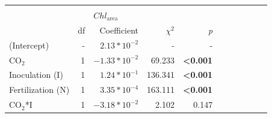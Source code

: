 \begin{landscape}
\begin{table}
{\begin{tabular}{p{3cm}p{0.5cm}p{1.75cm}p{1.5cm}p{1.5cm}p{1.75cm}p{1.5cm}p{1.5cm}p{1.75cm}p{1.5cm}p{1.5cm}}
            &&&&&&&&&&
            \\

            && \multicolumn{3}{l}{$Chl_\mathrm{area}$} &&&&& \\
            \hline
            & \multicolumn{1}{r}{df}
            & \multicolumn{1}{r}{Coefficient} & \multicolumn{1}{r}{$\chi^2$} & \multicolumn{1}{r}{\textit{p}} 
            \\
            \hline

            (Intercept) & \multicolumn{1}{r}{-}
            & \multicolumn{1}{r}{$2.13*10^{-2}$}  & \multicolumn{1}{r}{-}         & \multicolumn{1}{r}{-}
            & \multicolumn{1}{r}{}          & \multicolumn{1}{r}{}          & \multicolumn{1}{r}{}
            & \multicolumn{1}{r}{}          & \multicolumn{1}{r}{}          & \multicolumn{1}{r}{}
            \\

            CO$_2$ & \multicolumn{1}{r}{1}
            & \multicolumn{1}{r}{$-1.33*10^{-2}$} & \multicolumn{1}{r}{69.233}   & \multicolumn{1}{r}{\textbf{<0.001}}
            & \multicolumn{1}{r}{}          & \multicolumn{1}{r}{}          & \multicolumn{1}{r}{}
            & \multicolumn{1}{r}{}          & \multicolumn{1}{r}{}          & \multicolumn{1}{r}{} 
            \\


            Inoculation (I) & \multicolumn{1}{r}{1}
            & \multicolumn{1}{r}{$1.24*10^{-1}$}  & \multicolumn{1}{r}{136.341}   & \multicolumn{1}{r}{\textbf{<0.001}}
            & \multicolumn{1}{r}{}          & \multicolumn{1}{r}{}          & \multicolumn{1}{r}{}
            & \multicolumn{1}{r}{}          & \multicolumn{1}{r}{}          & \multicolumn{1}{r}{} 
            \\

            Fertilization (N) & \multicolumn{1}{r}{1}
            & \multicolumn{1}{r}{$3.35*10^{-4}$}  & \multicolumn{1}{r}{163.111}   & \multicolumn{1}{r}{\textbf{<0.001}}
            & \multicolumn{1}{r}{}          & \multicolumn{1}{r}{}          & \multicolumn{1}{r}{}
            & \multicolumn{1}{r}{}          & \multicolumn{1}{r}{}          & \multicolumn{1}{r}{} 
            \\

            CO$_2$*I & \multicolumn{1}{r}{1}
            & \multicolumn{1}{r}{$-3.18*10^{-2}$} & \multicolumn{1}{r}{2.102}   & \multicolumn{1}{r}{0.147}
            & \multicolumn{1}{r}{}          & \multicolumn{1}{r}{}          & \multicolumn{1}{r}{}
            & \multicolumn{1}{r}{}          & \multicolumn{1}{r}{}          & \multicolumn{1}{r}{} 
            \\


\end{tabular}}
\end{table}
\end{landscape}
